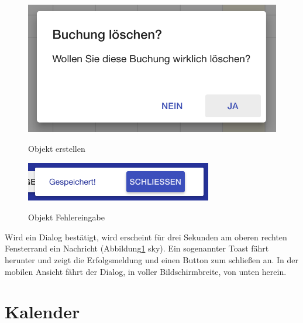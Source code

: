 \begin{figure}[H]
    \centering
    \begin{minipage}[t]{0.49\linewidth}
        \centering
        \includegraphics[width=\linewidth]{images/frontend_booking_delete_dialog.png}
        \label{frontend_booking_delete_dialog}
        \caption{Objekt erstellen}
    \end{minipage}%
    \hfill
    \begin{minipage}[t]{0.49\linewidth}
        \centering
        \includegraphics[width=\linewidth]{images/frontend_toast.png}
        \label{frontend_toast}
        \caption{Objekt Fehlereingabe}
    \end{minipage}
\end{figure}


Wird ein Dialog bestätigt, wird erscheint für drei Sekunden am oberen rechten Fensterrand ein Nachricht (Abbildung\ref{frontend_toast} sky). Ein sogenannter Toast fährt herunter und zeigt die Erfolgsmeldung und einen Button zum schließen an. In der mobilen Ansicht fährt der Dialog, in voller Bildschirmbreite, von unten herein. 

\section{Kalender}

